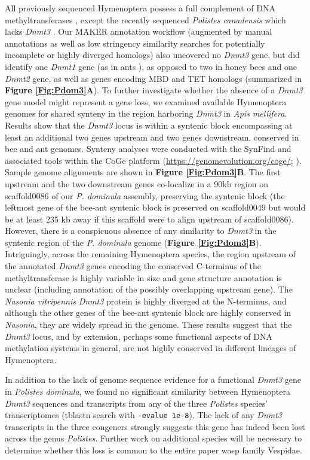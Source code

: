 All previously sequenced Hymenoptera possess a full complement of DNA
methyltransferases \cite{Yan2015}, except the recently sequenced \textit{Polistes canadensis}
which lacks \textit{Dnmt3} \cite{PcanGenome}. Our MAKER annotation workflow (augmented by manual
annotations as well as low stringency similarity searches for
potentially incomplete or highly diverged homologs) also uncovered no
\textit{Dnmt3} gene, but did identify one \textit{Dnmt1} gene (as in ants \cite{Bonasio2010}), as
opposed to two in honey bees \cite{Wang2006} and one \textit{Dnmt2} gene, as well as genes
encoding MBD and TET homologs (summarized in \textbf{Figure \ref{Fig:Pdom3}A}). To
further investigate whether the absence of a \textit{Dnmt3} gene model
might represent a gene loss, we examined available Hymenoptera genomes
for shared synteny in the region harboring \textit{Dnmt3} in \textit{Apis
mellifera}. Results show that the \textit{Dnmt3} locus is within a
syntenic block encompassing at least an additional two genes upstream
and two genes downstream, conserved in bee and ant genomes. Synteny
analyses were conducted with the SynFind and associated tools within the
CoGe platform (\url{https://genomevolution.org/coge/}; \cite{Tang2015}). Sample
genome alignments are shown in \textbf{Figure \ref{Fig:Pdom3}B}. The first upstream
and the two downstream genes co-localize in a 90kb region on
scaffold0086 of our \textit{P. dominula} assembly, preserving the syntenic
block (the leftmost gene of the bee-ant syntenic block is preserved on
scaffold0049 but would be at least 235 kb away if this scaffold were to
align upstream of scaffold0086). However, there is a conspicuous absence
of any similarity to \textit{Dnmt3} in the syntenic region of the \textit{P.
dominula} genome (\textbf{Figure \ref{Fig:Pdom3}B}). Intriguingly, across the
remaining Hymenoptera species, the region upstream of the annotated
\textit{Dnmt3} genes encoding the conserved C-terminus of the
methyltransferase is highly variable in size and gene structure
annotation is unclear (including annotation of the possibly overlapping
upstream gene). The \textit{Nasonia vitripennis} \textit{Dnmt3} protein is
highly diverged at the N-terminus, and although the other genes of the
bee-ant syntenic block are highly conserved in \textit{Nasonia}, they are
widely spread in the genome. These results suggest that the \textit{Dnmt3}
locus, and by extension, perhaps some functional aspects of DNA
methylation systems in general, are not highly conserved in different
lineages of Hymenoptera.

In addition to the lack of genome sequence evidence for a functional
\textit{Dnmt3} gene in \textit{Polistes dominula}, we found no significant
similarity between Hymenoptera \textit{Dnmt3} sequences and transcripts
from any of the three \textit{Polistes} species' transcriptomes \cite{Berens2015,PcanTrans}
(tblastn search with \texttt{-evalue 1e-8}). The lack of any \textit{Dnmt3}
transcripts in the three congeners strongly suggests this gene has
indeed been lost across the genus \textit{Polistes.} Further work on
additional species will be necessary to determine whether this loss is
common to the entire paper wasp family Vespidae.

